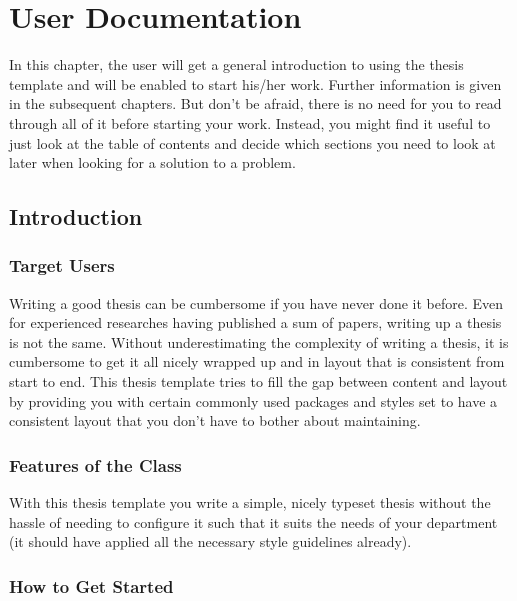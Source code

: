 \lstset{language=[LaTeX]TeX}

\chapter{User Documentation}

\begin{intro}
In this chapter, the user will get a general introduction to using the thesis template and will be enabled to start his/her work.
Further information is given in the subsequent chapters.
But don't be afraid, there is no need for you to read through all of it before starting your work.
Instead, you might find it useful to just look at the table of contents and decide which sections you need to look at later when looking for a solution to a problem.
\end{intro}


\section{Introduction}\label{sec:user-documentation:introduction}

\subsection{Target Users}\label{sec:user-documentation:target-users}

Writing a good thesis can be cumbersome if you have never done it before.
Even for experienced researches having published a sum of papers, writing up a thesis is not the same.
Without underestimating the complexity of writing a thesis, it is cumbersome to get it all nicely wrapped up and in layout that is consistent from start to end.
This thesis template tries to fill the gap between content and layout by providing you with certain commonly used packages and styles set to have a consistent layout that you don't have to bother about maintaining.


\subsection{Features of the Class}\label{sec:user-documentation:features}

With this thesis template you write a simple, nicely typeset thesis without the hassle of needing to configure it such that it suits the needs of your department (it should have applied all the necessary style guidelines already).


\subsection{How to Get Started}\label{sec:user-documentation:get-started}

